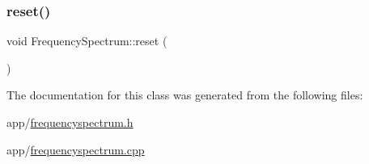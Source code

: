 \hypertarget{class_frequency_spectrum_aa7ea1c62eda905cb7674ea5c9b436aea}{}\label{class_frequency_spectrum_aa7ea1c62eda905cb7674ea5c9b436aea} 
\subsubsection{\texorpdfstring{reset()}{reset()}}
{\footnotesize\ttfamily void Frequency\+Spectrum\+::reset (\begin{DoxyParamCaption}{ }\end{DoxyParamCaption})}



The documentation for this class was generated from the following files\+:\begin{DoxyCompactItemize}
\item 
app/\hyperlink{frequencyspectrum_8h}{frequencyspectrum.\+h}\item 
app/\hyperlink{frequencyspectrum_8cpp}{frequencyspectrum.\+cpp}\end{DoxyCompactItemize}
